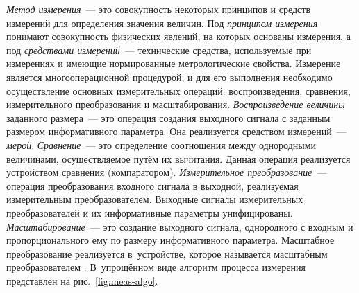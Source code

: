 \documentclass[a4paper, 14pt, titlepage]{extarticle}
\newcommand{\term}[1]{\emph{#1}}
\newenvironment{myfigure}[2]%
    {\pushQED{\caption{#1} \label{#2}} %
     \begin{figure}[!htb]\centering } %
    {  \popQED %
     \end{figure}}
\begin{document}
  \term{Метод измерения}~--- это совокупность некоторых принципов и средств измерений для
  определения значения величин. Под \term{принципом измерения} понимают совокупность физических явлений, на
  которых основаны измерения, а под \term{средствами измерений}~--- технические средства, используемые при
  измерениях и имеющие нормированные метрологические свойства. Измерение является
  многооперационной процедурой, и для его выполнения необходимо осуществление основных измерительных
  операций: воспроизведения, сравнения, измерительного преобразования и масштабирования.
  \term{Воспроизведение величины} заданного размера~--- это операция создания выходного сигнала с
  заданным размером информативного параметра. Она реализуется средством измерений~--- \term{мерой}.
  \term{Сравнение}~--- это определение соотношения между однородными величинами, осуществляемое
  путём их вычитания. Данная операция реализуется устройством сравнения (компаратором).
  \term{Измерительное преобразование}~--- операция преобразования входного сигнала в выходной,
  реализуемая измерительным преобразователем. Выходные сигналы измерительных преобразователей и их
  информативные параметры унифицированы.
  \term{Масштабирование}~--- это создание выходного сигнала, однородного с входным и
  пропорционального ему по размеру информативного параметра. Масштабное преобразование реализуется
  в~устройстве, которое называется масштабным преобразователем \cite[с.~16]{volkov-iis}.
  В~упрощённом виде алгоритм процесса измерения представлен на рис.~\ref{fig:meas-algo}.

  \begin{myfigure}{Структурная схема алгоритма измерения}{fig:meas-algo}
  \end{myfigure}
\end{document}
